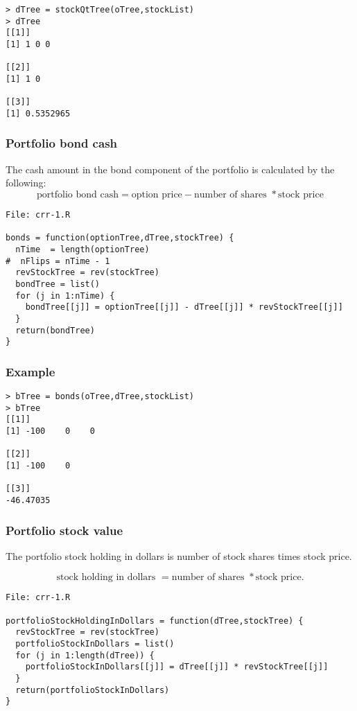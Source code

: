 \documentclass[10pt]{article}
\begin{document}
\begin{verbatim}
> dTree = stockQtTree(oTree,stockList)
> dTree
[[1]]
[1] 1 0 0

[[2]]
[1] 1 0

[[3]]
[1] 0.5352965
\end{verbatim}

\subsubsection*{Portfolio bond cash}
The cash amount in the bond component of the portfolio is calculated by the following:
\[
\text{portfolio bond cash} = \text{option price} - \text{number of shares } * \text{stock price}
\]

\begin{verbatim}
File: crr-1.R

bonds = function(optionTree,dTree,stockTree) {
  nTime  = length(optionTree)
#  nFlips = nTime - 1
  revStockTree = rev(stockTree)
  bondTree = list()
  for (j in 1:nTime) {
    bondTree[[j]] = optionTree[[j]] - dTree[[j]] * revStockTree[[j]]
  }
  return(bondTree)
}
\end{verbatim}

\subsubsection*{Example}

\begin{verbatim}
> bTree = bonds(oTree,dTree,stockList)
> bTree
[[1]]
[1] -100    0    0

[[2]]
[1] -100    0

[[3]]
-46.47035
\end{verbatim}

\subsubsection*{Portfolio stock value}

The portfolio stock holding in dollars is number of stock shares times stock price.

\[
\text{stock holding in dollars } = \text{number of shares } * \text{stock price.}
\]

\begin{verbatim}
File: crr-1.R

portfolioStockHoldingInDollars = function(dTree,stockTree) {
  revStockTree = rev(stockTree)
  portfolioStockInDollars = list()
  for (j in 1:length(dTree)) {
    portfolioStockInDollars[[j]] = dTree[[j]] * revStockTree[[j]]
  }
  return(portfolioStockInDollars)
}
\end{verbatim}
\end{document}
